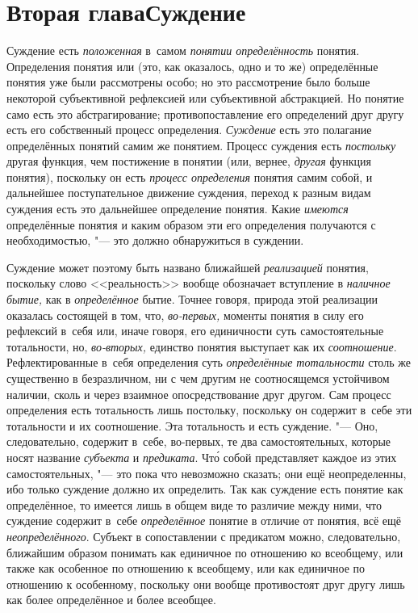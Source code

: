 \chapter[Вторая глава. Суждение]{Вторая глава\newline Суждение}

Суждение есть {\em положенная} в~самом {\em понятии определённость}
понятия. Определения понятия или (это, как оказалось, одно и
то же) определённые понятия уже были рассмотрены особо; но это рассмотрение
было больше некоторой субъективной рефлексией или субъективной абстракцией.
Но понятие само есть это абстрагирование; противопоставление его
определений друг другу есть его собственный процесс определения. {\em Суждение}
есть это полагание определённых понятий самим же понятием. Процесс суждения
есть {\em постольку} другая функция, чем постижение в понятии (или, вернее,
{\em другая} функция понятия), поскольку он есть {\em процесс
определения} понятия самим собой, и дальнейшее
поступательное движение суждения, переход к разным видам
суждения есть это дальнейшее определение понятия. Какие {\em имеются}
определённые понятия и каким образом эти его определения
получаются с необходимостью, "--- это должно обнаружиться в суждении.

Суждение может поэтому быть названо ближайшей {\em реализацией}
понятия, поскольку слово <<реальность>> вообще обозначает
вступление в {\em наличное бытие,} как в {\em определённое}
бытие. Точнее говоря, природа этой реализации оказалась
состоящей в том, что, {\em во-первых,}
моменты понятия в силу его рефлексий в~себя или, иначе
говоря, его единичности суть самостоятельные тотальности, но,
{\em во-вторых,} единство понятия выступает как их {\em соотношение}.
Рефлектированные в~себя определения суть {\em определённые тотальности}
столь же существенно в безразличном, ни с чем другим не
соотносящемся устойчивом наличии, сколь и через взаимное опосредствование
друг другом. Сам процесс определения есть тотальность лишь постольку,
поскольку он содержит в~себе эти тотальности и их соотношение. Эта
тотальность и есть суждение. "--- Оно, следовательно, содержит
в~себе, во-первых, те два самостоятельных, которые носят название
{\em субъекта} и {\em предиката}. Чт\'{о}
собой представляет каждое из этих самостоятельных, "--- это
пока что невозможно сказать; они ещё неопределенны, ибо только суждение
должно их определить. Так как суждение есть понятие как определённое, то
имеется лишь в общем виде то различие между ними, что суждение содержит
в~себе {\em определённое} понятие в отличие от понятия, всё ещё
{\em неопределённого}. Субъект в сопоставлении с предикатом можно,
следовательно, ближайшим образом понимать как единичное по отношению ко
всеобщему, или также как особенное по отношению к всеобщему, или как
единичное по отношению к особенному, поскольку они вообще противостоят
друг другу лишь как более определённое и более всеобщее.

